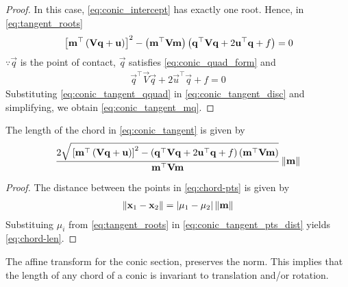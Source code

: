 \documentclass[journal,12pt,onecolumn]{IEEEtran}
\begin{document}
\begin{proof}
  In this case, \eqref{eq:conic_intercept} has exactly one root.  Hence, 
  in \eqref{eq:tangent_roots}
  \begin{align}
  {}\left[
  \mathbf{m}^{\top}\left(\mathbf{V}\mathbf{q}+\mathbf{u}\right)
  \right]^2 -\left(\mathbf{m}^{\top}\mathbf{V}\mathbf{m}\right)
  \left(
  \mathbf{q}^{\top}\mathbf{V}\mathbf{q} + 2\mathbf{u}^{\top}\mathbf{q} +f
  \right) = 0                                                                                             
  \label{eq:conic_tangent_disc}
  \end{align}                    
  $\because \vec{q}$ is the point of contact, $\vec{q}$ satisfies \eqref{eq:conic_quad_form}
  and 
  \begin{align}
  \vec{q}^{\top}\vec{V}\vec{q} + 2\vec{u}^{\top}\vec{q} +f = 0
  \label{eq:conic_tangent_qquad}
  \end{align}
  Substituting \eqref{eq:conic_tangent_qquad} in \eqref{eq:conic_tangent_disc} and simplifying, we obtain \eqref{eq:conic_tangent_mq}.
\end{proof}
	\begin{theorem}
		The length of the chord in 
\eqref{eq:conic_tangent}
is given by 
\begin{align}
 \frac{2\sqrt{
{}\left[
\mathbf{m}^{\top}\left(\mathbf{V}\mathbf{q}+\mathbf{u}\right)
\right]^2
-
\left(
\mathbf{q}^{\top}\mathbf{V}\mathbf{q} + 2\mathbf{u}^{\top}\mathbf{q} +f
\right)
\left(\mathbf{m}^{\top}\mathbf{V}\mathbf{m}\right)
}
}
{
\mathbf{m}^{\top}\mathbf{V}\mathbf{m}
}\left\lVert\mathbf{m}\right\rVert
\label{eq:chord-len}
  \end{align}
	\end{theorem}
\begin{proof}
The distance between the points in 
	\eqref{eq:chord-pts}
is given by 
\begin{align}
	\left\lVert\mathbf{x}_1-\mathbf{x}_2\right\rVert =  \left\vert\mu_1-\mu_2\right\vert \left\lVert\mathbf{m}\right\rVert
\label{eq:conic_tangent_pts_dist}
\end{align}
Substituing $\mu_i$ from 
\eqref{eq:tangent_roots} in
\eqref{eq:conic_tangent_pts_dist}
yields
	\eqref{eq:chord-len}.
\end{proof}
	\begin{theorem}
 The affine transform for the conic section, preserves the norm.  This implies that the length of any chord of a conic
	is invariant to translation and/or rotation.
	\end{theorem}
\end{document}
